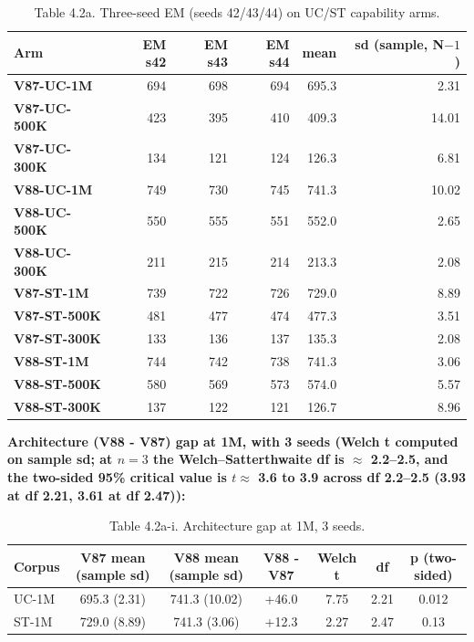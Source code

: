 \documentclass[11pt]{article}
\begin{document}
\begin{table}[!t]
\centering
\footnotesize
\caption*{Table 4.2a. Three-seed EM (seeds 42/43/44) on UC/ST capability arms.}
\begin{tabular}{lrrrrr}
\toprule
Arm            & EM s42 & EM s43 & EM s44 & mean  & sd (sample, N$-1$) \\
\midrule
\textbf{V87-UC-1M}   &    694 &    698 &    694 & 695.3 &     2.31  \\
\textbf{V87-UC-500K} &    423 &    395 &    410 & 409.3 &    14.01  \\
\textbf{V87-UC-300K} &    134 &    121 &    124 & 126.3 &     6.81  \\
\textbf{V88-UC-1M}   &    749 &    730 &    745 & 741.3 &    10.02  \\
\textbf{V88-UC-500K} &    550 &    555 &    551 & 552.0 &     2.65  \\
\textbf{V88-UC-300K} &    211 &    215 &    214 & 213.3 &     2.08  \\
\textbf{V87-ST-1M}   &    739 &    722 &    726 & 729.0 &     8.89  \\
\textbf{V87-ST-500K} &    481 &    477 &    474 & 477.3 &     3.51  \\
\textbf{V87-ST-300K} &    133 &    136 &    137 & 135.3 &     2.08  \\
\textbf{V88-ST-1M}   &    744 &    742 &    738 & 741.3 &     3.06  \\
\textbf{V88-ST-500K} &    580 &    569 &    573 & 574.0 &     5.57  \\
\textbf{V88-ST-300K} &    137 &    122 &    121 & 126.7 &     8.96  \\
\bottomrule
\end{tabular}
\end{table}

\textbf{Architecture (V88 - V87) gap at 1M, with 3 seeds (Welch t computed on sample sd; at $n = 3$ the Welch--Satterthwaite df is $\approx$ 2.2--2.5, and the two-sided 95\% critical value is $t \approx$ 3.6 to 3.9 across df 2.2--2.5 (3.93 at df 2.21, 3.61 at df 2.47)):}

\begin{table}[!t]
\centering
\footnotesize
\caption*{Table 4.2a-i. Architecture gap at 1M, 3 seeds.}
\begin{tabular}{lcccccc}
\toprule
Corpus & V87 mean (sample sd) & V88 mean (sample sd) & V88 - V87 & Welch t & df & p (two-sided) \\
\midrule
UC-1M  & 695.3 (2.31) & 741.3 (10.02) &    +46.0  &   7.75  & 2.21 & 0.012 \\
ST-1M  & 729.0 (8.89) & 741.3 (3.06)  &    +12.3  &   2.27  & 2.47 & 0.13  \\
\bottomrule
\end{tabular}
\end{table}
\end{document}
